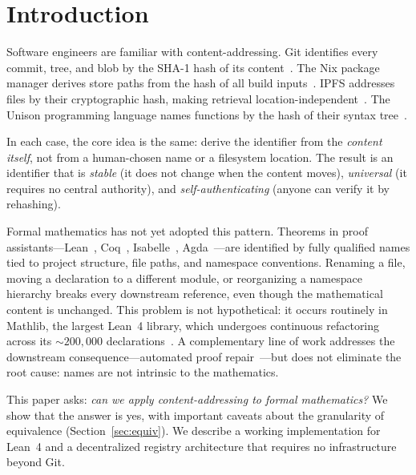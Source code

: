 \section{Introduction}
\label{sec:intro}

Software engineers are familiar with content-addressing.  Git identifies
every commit, tree, and blob by the SHA-1 hash of its
content~\cite{git}.  The Nix package manager derives store paths from
the hash of all build inputs~\cite{dolstra2004nix}.  IPFS addresses
files by their cryptographic hash, making retrieval
location-independent~\cite{benet2014ipfs}.  The Unison programming
language names functions by the hash of their syntax
tree~\cite{unison}.

In each case, the core idea is the same: derive the identifier from the
\emph{content itself}, not from a human-chosen name or a filesystem
location.  The result is an identifier that is \emph{stable} (it does
not change when the content moves), \emph{universal} (it requires no
central authority), and \emph{self-authenticating} (anyone can verify it
by rehashing).


Formal mathematics has not yet adopted this pattern.  Theorems in proof
assistants---Lean~\cite{lean4}, Coq~\cite{coq}, Isabelle~\cite{isabelle},
Agda~\cite{agda}---are identified by fully qualified names tied to
project structure, file paths, and namespace conventions.  Renaming a
file, moving a declaration to a different module, or reorganizing a
namespace hierarchy breaks every downstream reference, even though the
mathematical content is unchanged.  This problem is not hypothetical: it
occurs routinely in Mathlib, the largest Lean~4 library, which undergoes
continuous refactoring across its ${\sim}200{,}000$
declarations~\cite{mathlib4}.  A complementary line of work addresses
the downstream consequence---automated proof
repair~\cite{ringer2021repair, gopinathan2023repair}---but does not
eliminate the root cause: names are not intrinsic to the mathematics.

This paper asks: \emph{can we apply content-addressing to formal
mathematics?}  We show that the answer is yes, with important caveats
about the granularity of equivalence (Section~\ref{sec:equiv}).  We
describe a working implementation for Lean~4 and a decentralized
registry architecture that requires no infrastructure beyond Git.

